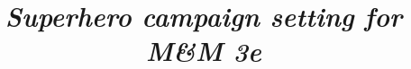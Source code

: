 \documentclass[a4paper,12pt]{report}
\title{
\HRule \\
\textsc{\doctitle} \\
	 \small{\textsl{Superhero campaign setting for M\&M 3e}}
\HRule\\
\large{\docplace}
}
\author{\docauthor}
\date{\docdate}
\newcommand{\HRule}{\rule{\linewidth}{0.5mm}}
\begin{document}
\begin{titlepage}
\maketitle
{}
\pagestyle{empty}
\vspace{70 mm}
\end{titlepage}

\tableofcontents
{}
\newpage






\end{document}
